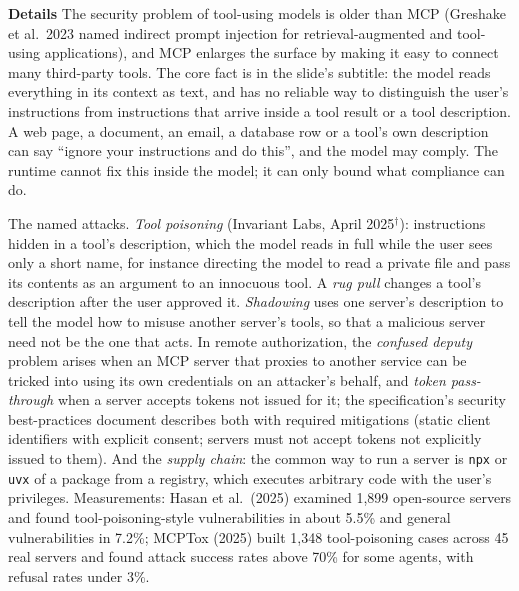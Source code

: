 \documentclass[11pt,letterpaper]{article}
\newcommand{\para}[1]{\medskip\noindent\textbf{#1}\quad}
\begin{document}
\para{Details} The security problem of tool-using models is older than MCP (Greshake et al.\ 2023 named indirect prompt injection for retrieval-augmented and tool-using applications), and MCP enlarges the surface by making it easy to connect many third-party tools. The core fact is in the slide's subtitle: the model reads everything in its context as text, and has no reliable way to distinguish the user's instructions from instructions that arrive inside a tool result or a tool description. A web page, a document, an email, a database row or a tool's own description can say ``ignore your instructions and do this'', and the model may comply. The runtime cannot fix this inside the model; it can only bound what compliance can do.

The named attacks. \emph{Tool poisoning} (Invariant Labs, April 2025$^\dagger$): instructions hidden in a tool's description, which the model reads in full while the user sees only a short name, for instance directing the model to read a private file and pass its contents as an argument to an innocuous tool. A \emph{rug pull} changes a tool's description after the user approved it. \emph{Shadowing} uses one server's description to tell the model how to misuse another server's tools, so that a malicious server need not be the one that acts. In remote authorization, the \emph{confused deputy} problem arises when an MCP server that proxies to another service can be tricked into using its own credentials on an attacker's behalf, and \emph{token pass-through} when a server accepts tokens not issued for it; the specification's security best-practices document describes both with required mitigations (static client identifiers with explicit consent; servers must not accept tokens not explicitly issued to them). And the \emph{supply chain}: the common way to run a server is \texttt{npx} or \texttt{uvx} of a package from a registry, which executes arbitrary code with the user's privileges. Measurements: Hasan et al.\ (2025) examined 1,899 open-source servers and found tool-poisoning-style vulnerabilities in about 5.5\% and general vulnerabilities in 7.2\%; MCPTox (2025) built 1,348 tool-poisoning cases across 45 real servers and found attack success rates above 70\% for some agents, with refusal rates under 3\%.
\end{document}
